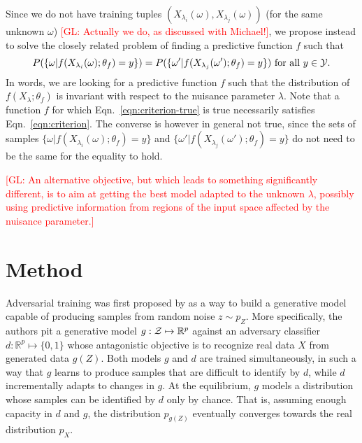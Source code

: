\documentclass{article}
\newcommand{\glnote}[1]{\textcolor{red}{[GL: #1]}}
\theoremstyle{plain}
\begin{document}
Since we do not have training tuples $(X_{\lambda_i}(\omega),
X_{\lambda_j}(\omega))$ (for the same unknown $\omega$) \glnote{Actually we do, as discussed with Michael!}, we propose instead to
solve the closely related problem of finding a predictive function $f$ such that
\begin{equation}\label{eqn:criterion}
    P(\{ \omega | f(X_{\lambda_i}(\omega) ; \theta_f) = y \} ) = P( \{ \omega' | f(X_{\lambda_j}(\omega') ; \theta_f) = y\}) \text{ for all $y \in {\cal Y}$}.
\end{equation}
In words, we are looking for a predictive function $f$ such that  the
distribution of $f(X_\lambda; \theta_f)$ is invariant with respect to the nuisance
parameter $\lambda$. Note that a function $f$ for which Eqn.~\ref{eqn:criterion-true} is
true necessarily satisfies Eqn.~\ref{eqn:criterion}. The converse is however in
general not true, since the sets of samples $\{ \omega | f(X_{\lambda_i}(\omega); \theta_f) = y \}$
and $\{ \omega' | f(X_{\lambda_j}(\omega'); \theta_f) = y \}$ do not need to be the same
for the equality to hold.

\glnote{An alternative objective, but which leads to something
significantly different, is to aim at getting the best model adapted
to the unknown $\lambda$, possibly using predictive information from
regions of the input space affected by the nuisance parameter.}


\section{Method}
\label{sec:method}

Adversarial training was first proposed by \cite{goodfellow2014generative} as a
way to build a generative model capable of producing samples from random noise
$z \sim p_Z$. More specifically, the authors pit a generative model $g: {\cal Z}
\mapsto \mathbb{R}^p$ against an adversary classifier $d : \mathbb{R}^p \mapsto \{
0, 1\}$ whose antagonistic objective is to recognize real data $X$ from generated data $g(Z)$. Both
models $g$ and $d$ are trained simultaneously, in such a way that $g$ learns to
produce samples that are difficult to identify by $d$, while $d$ incrementally
adapts to changes in $g$. At the equilibrium, $g$ models a distribution whose
samples can be identified by $d$ only by chance. That is, assuming enough
capacity in $d$ and  $g$, the distribution $p_{g(Z)}$ eventually converges
towards the real distribution $p_X$.
\end{document}

